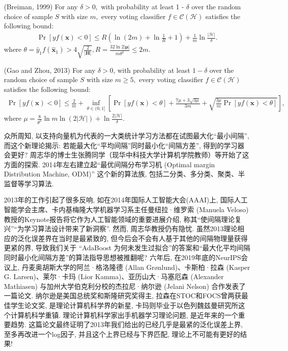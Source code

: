 \begin{mythm}{(Breiman, 1999)}{}\label{AIthm7.2}
For any $\delta>0,$ with probability at least 1 - $\delta$ over the random choice of sample $S$ with size $m,$ every voting classifier $f \in \mathcal{C}(\mathcal{H})$ satisfies the following bound:
\begin{align}
    \operatorname{Pr}[y f(\boldsymbol{x})<0] \leq R\left(\ln (2 m)+\ln \frac{1}{R}+1\right)+\frac{1}{m} \ln \frac{|\mathcal{H}|}{\delta}.
\end{align}
where $\theta=\hat{y}_{1} f\left(\hat{\boldsymbol{x}}_{1}\right)>4 \sqrt{\frac{2}{|\boldsymbol{H}|}}, R=\frac{32 \ln 2|\boldsymbol{\mu}|}{m \theta^{2}} \leq 2 m$.
\end{mythm}

\begin{mythm}{(Gao and Zhou, 2013)}{}\label{AIthm7.3}
For any $\delta>0$, with probability at least $1-\delta$ over the random choice of sample $S$ with size $m \geq 5,$ every voting classifier $f \in \mathcal{C}(\mathcal{H})$ satisfies the following bound:
\begin{align}
    \operatorname{Pr}[y f(\boldsymbol{x})<0] \leq \frac{2}{m}+\inf _{\theta \in(0,1]}\left[\operatorname{Pr}[y f(\boldsymbol{x})<\theta]+\frac{7 \mu+3 \sqrt{3 \mu}}{3 m}+\sqrt{\frac{3 \mu}{m} \operatorname{Pr}[y f(\boldsymbol{x})<\theta]}\right],
\end{align}
where $\mu=\frac{8}{\theta^{2}} \ln m \ln (2|\mathcal{H}|)+\ln \frac{2|\mathcal{H}|}{\delta}$.
\end{mythm}

众所周知, 以支持向量机为代表的一大类统计学习方法都在试图最大化“最小间隔”, 而这个新理论揭示: 若能最大化“平均间隔”同时最小化“间隔方差”, 得到的学习器会更好?
周志华的博士生张腾同学（现华中科技大学计算机学院教师）等开始了这方面的探索.
2014年左右建立起“最优间隔分布学习机 (Optimal margin Distribution Machine, ODM)” 这个新的算法族, 包括二分类、多分类、聚类、半监督等学习算法.

2013年的工作引起了很多反响, 如在2014年国际人工智能大会(AAAI)上, 国际人工智能学会主席、卡内基梅隆大学机器学习系主任曼纽拉·维罗索 (Manuela Veloso) 教授的Keynote报告将它作为人工智能领域的重要进展介绍, 称其“使间隔理论复兴”“为学习算法设计带来了新洞察”.
然而, 周志华教授仍有隐忧. 
虽然2013理论相应的泛化误差界在当时是最紧致的, 但今后会不会有人基于其他的间隔物理量获得更紧的界, 导致我们关于 “AdaBoost 为何未发生过拟合”的答案和“最大化平均间隔同时最小化间隔方差”的算法指导思想被推翻呢?
六年后, 在2019年底的NeurIPS会议上, 丹麦奥胡斯大学的阿兰·格洛隆德 (Allan Grønlund)、卡斯柏·拉森 (Kasper G. Larsen)、莱尔·卡玛 (Lior Kamma)、亚历山大·马塞厄森 (Alexander Mathiasen) 与加州大学伯克利分校的杰拉尼·纳尔逊 (Jelani Nelson) 合作发表了一篇论文. 
纳尔逊是美国总统奖和斯隆研究奖得主, 拉森在STOC和FOCS曾两获最佳学生论文奖, 是理论计算机科学界的新星, 卡玛则毕业于以色列魏兹曼研究所这个计算机科学重镇.
理论计算机科学家出手机器学习理论问题, 是近年来的一个重要趋势. 
这篇论文最终证明了2013年我们给出的已经几乎是最紧的泛化误差上界, 至多再改进一个log因子, 并且这个上界已经与下界匹配, 理论上不可能有更好的结果!

